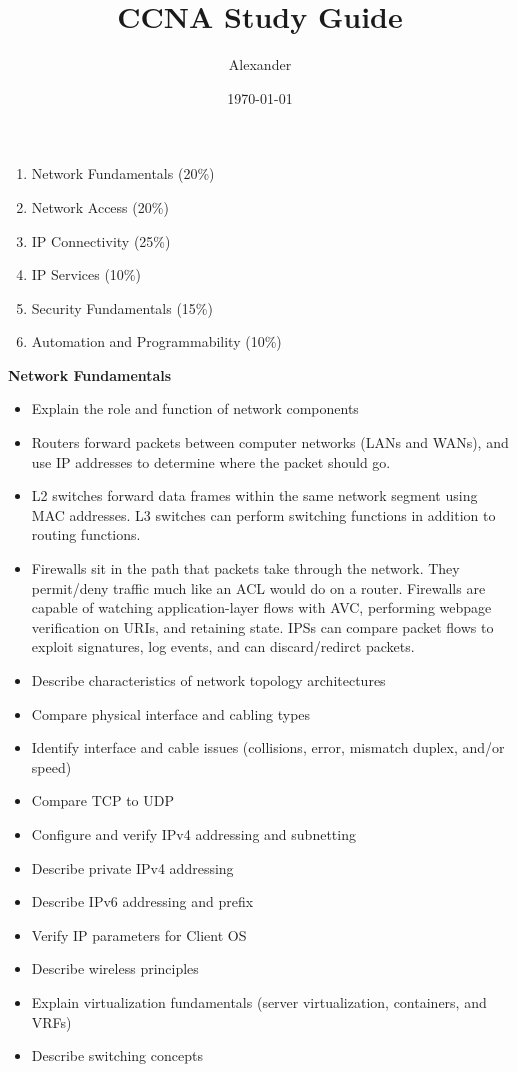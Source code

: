 \documentclass{article}
\title{CCNA Study Guide}
\author{Alexander}
\date{\today}
\begin{document}
\maketitle

\begin{enumerate}
  \item Network Fundamentals (20\%)
  \item Network Access (20\%)
  \item IP Connectivity (25\%)
  \item IP Services (10\%)
  \item Security Fundamentals (15\%)
  \item Automation and Programmability (10\%)\\
\end{enumerate}



\begin{flushleft}\textbf{Network Fundamentals}\end{flushleft}
\begin{itemize}
  \item Explain the role and function of network components
  
  	\item[] Routers forward packets between computer networks (LANs and WANs), and use IP addresses to determine where the packet should go.

	\item[] L2 switches forward data frames within the same network segment using MAC addresses. L3 switches can perform switching functions in addition to routing functions.

	\item[] Firewalls sit in the path that packets take through the network. They permit/deny traffic much like an ACL would do on a router. Firewalls are capable of watching application-layer flows with AVC, performing webpage verification on URIs, and retaining state. IPSs can compare packet flows to exploit signatures, log events, and can discard/redirct packets.

  \item Describe characteristics of network topology architectures
  \item Compare physical interface and cabling types
  \item Identify interface and cable issues (collisions, error, mismatch duplex, and/or speed)
  \item Compare TCP to UDP
  \item Configure and verify IPv4 addressing and subnetting
  \item Describe private IPv4 addressing
  \item Describe IPv6 addressing and prefix
  \item Verify IP parameters for Client OS
  \item Describe wireless principles
  \item Explain virtualization fundamentals (server virtualization, containers, and VRFs)
  \item Describe switching concepts\\
\end{itemize}
\end{document}
